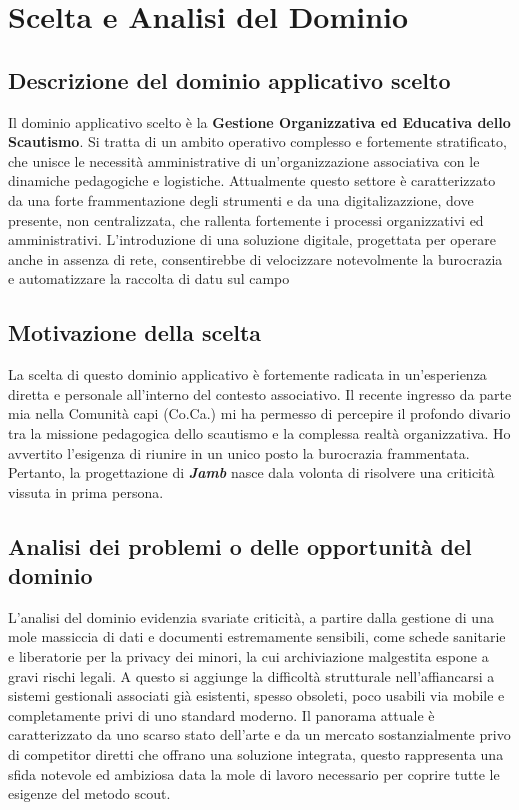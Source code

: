 \documentclass[11pt]{article}
\begin{document}
\newpage

\section{Scelta e Analisi del Dominio}
\subsection{Descrizione del dominio applicativo scelto}
Il dominio applicativo scelto è la \textbf{Gestione Organizzativa ed Educativa dello Scautismo}. Si tratta di un ambito operativo complesso e fortemente stratificato, che unisce le necessità amministrative di un'organizzazione associativa con le dinamiche pedagogiche e logistiche. Attualmente questo settore è caratterizzato da una forte frammentazione degli strumenti e da una digitalizazzione, dove presente, non centralizzata, che rallenta fortemente i processi organizzativi ed amministrativi. L'introduzione di una soluzione digitale, progettata per operare anche in assenza di rete, consentirebbe di velocizzare notevolmente la burocrazia e automatizzare la raccolta di datu sul campo

\subsection{Motivazione della scelta}
La scelta di questo dominio applicativo è fortemente radicata in un'esperienza diretta e personale all'interno del contesto associativo. Il recente ingresso da parte mia nella Comunità capi (Co.Ca.) mi ha permesso di percepire il profondo divario  tra la missione pedagogica dello scautismo e la complessa realtà organizzativa. Ho avvertito l'esigenza di riunire in un unico posto la burocrazia frammentata. Pertanto, la progettazione di \textit{\textbf{Jamb}} nasce dala volonta di risolvere una criticità vissuta in prima persona.

\subsection{Analisi dei problemi o delle opportunità del dominio}
L'analisi del dominio evidenzia svariate criticità, a partire dalla gestione di una mole massiccia di dati e documenti estremamente sensibili, come schede sanitarie e liberatorie per la privacy dei minori, la cui archiviazione malgestita espone a gravi rischi legali. A questo si aggiunge la difficoltà strutturale nell'affiancarsi a sistemi gestionali associati già esistenti, spesso obsoleti, poco usabili via mobile e completamente privi di uno standard moderno. Il panorama attuale è caratterizzato da uno scarso stato dell'arte e da un mercato sostanzialmente privo di competitor diretti che offrano una soluzione integrata, questo rappresenta una sfida notevole ed ambiziosa data la mole di lavoro necessario per coprire tutte le esigenze del metodo scout. 
\end{document}
